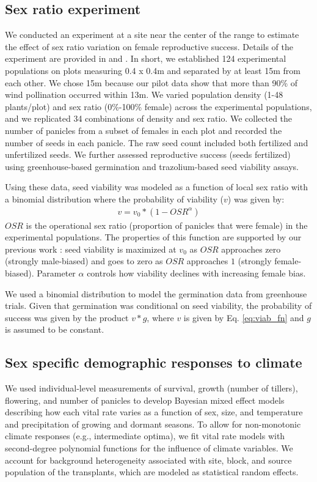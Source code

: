 \documentclass[11pt]{article}\usepackage[]{graphicx}\usepackage[usenames,dvipsnames]{xcolor}
\begin{document}
\subsection*{Sex ratio experiment}
We conducted an experiment at a site near the center of the range to estimate the effect of sex ratio variation on female reproductive success.
Details of the experiment are provided in \cite{compagnoni2017can} and \cite{miller2022two}.
In short, we established 124 experimental populations on plots measuring 0.4 x 0.4m and separated by at least 15m from each other. 
We chose 15m because our pilot data show that more than 90\% of wind pollination occurred within 13m. 
We varied population density (1-48 plants/plot) and sex ratio (0\%-100\% female) across the experimental populations, and we replicated 34 combinations of density and sex ratio. 
We collected the number of panicles from a subset of females in each plot and recorded the number of seeds in each panicle. 
The raw seed count included both fertilized and unfertilized seeds.  
We further assessed reproductive success (seeds fertilized) using greenhouse-based germination and trazolium-based seed viability assays. 

Using these data, seed viability was modeled as a function of local sex ratio with a binomial distribution where the probability of viability ($v$) was given by:
\begin{align}\label{eq:viab_fn}
v = v_{0} * (1 - OSR^{\alpha})
\end{align}
\noindent $OSR$ is the operational sex ratio (proportion of panicles that were female) in the experimental populations.
The properties of this function are supported by our previous work \citep{compagnoni2017can}: seed viability is maximized at $v_{0}$ as $OSR$ approaches zero (strongly male-biased) and goes to zero as $OSR$ approaches $1$ (strongly female-biased).
Parameter $\alpha$ controls how viability declines with increasing female bias.

We used a binomial distribution to model the germination data from greenhouse trials.
Given that germination was conditional on seed viability, the probability of success was given by the product $v*g$, where $v$ is given by Eq. \ref{eq:viab_fn} and $g$ is assumed to be constant.

\subsection*{Sex specific demographic responses to climate}
We used individual-level measurements of survival, growth (number of tillers), flowering, and number of panicles to develop Bayesian mixed effect models describing how each vital rate varies as a function of sex, size, and temperature and precipitation of growing and dormant seasons. 
To allow for non-monotonic climate responses (e.g., intermediate optima), we fit vital rate models with second-degree polynomial functions for the influence of climate variables.
We account for background heterogeneity associated with site, block, and source population of the transplants, which are modeled as statistical random effects.
\end{document}
